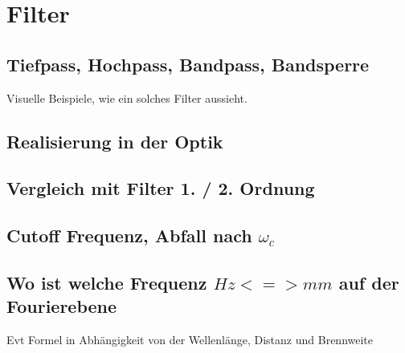 %
%
%
%
\section{Filter
\label{opt:section:filter}}

\subsection{Tiefpass, Hochpass, Bandpass, Bandsperre}
Visuelle Beispiele, wie ein solches Filter aussieht.

\subsection{Realisierung in der Optik}

\subsection{Vergleich mit Filter 1. / 2. Ordnung}

\subsection{Cutoff Frequenz, Abfall nach $\omega_c$}

\subsection{Wo ist welche Frequenz $Hz <=> mm$ auf der Fourierebene}
Evt Formel in Abhängigkeit von der Wellenlänge, Distanz und Brennweite
